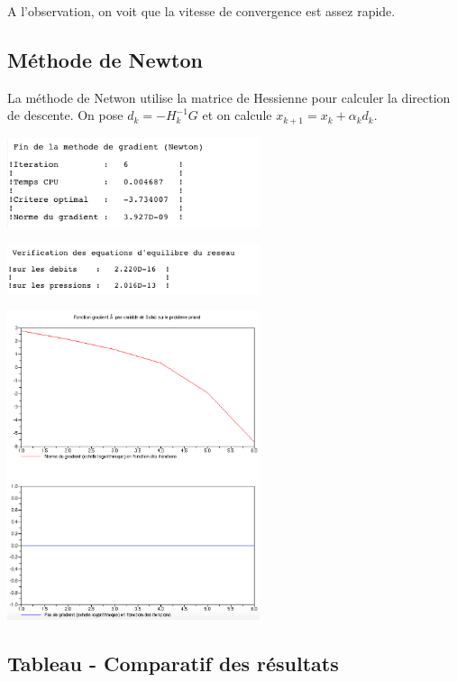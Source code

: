 A l'observation, on voit que la vitesse de convergence est assez rapide.

\subsection{Méthode de Newton}

La méthode de Netwon utilise la matrice de Hessienne pour calculer la direction de descente. On pose $d_k = - H_k^{-1} G$ et on calcule $x_{k+1} = x_k + \alpha_k d_k$.

\vspace{2em}
\begin{center}
  \includegraphics[width=20em]{newton.png}
  
  \includegraphics[width=20em]{newton_v.png}

  \includegraphics[width=20em]{newton_f.png}
\end{center}


\subsection{Tableau - Comparatif des résultats}

